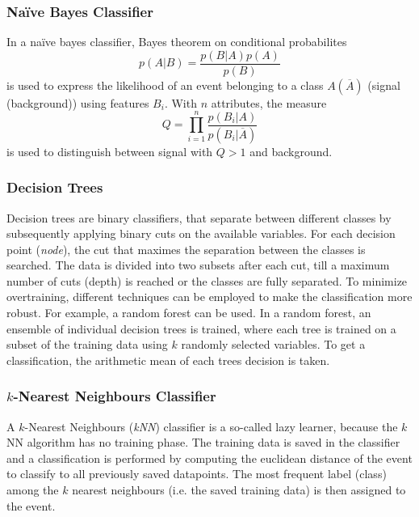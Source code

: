 \subsubsection{Na\"ive Bayes Classifier}
\label{subsec:Bayes}
In a na\"ive bayes classifier, Bayes theorem on conditional probabilites
\begin{equation}
    p(A|B) = \frac{p(B|A)p(A)}{p(B)}
    \label{eq:Bayes}
\end{equation}
is used to express the likelihood of an event belonging to a class $A(\overline{A})$ (signal (background)) using features $B_i$.
With $n$ attributes, the measure 
\begin{equation}
    Q = \prod_{i=1}^{n} \frac{p(B_i|A)}{p(B_i|\overline{A})}
\end{equation}
is used to distinguish between signal with $Q > 1$ and background.

\subsubsection{Decision Trees}
Decision trees are binary classifiers, that separate between different classes by subsequently applying binary cuts on the available variables. 
For each decision point (\textit{node}), the cut that maximes the separation between the classes is searched. The data is divided into two subsets after each cut, till a
maximum number of cuts (depth) is reached or the classes are fully separated.
To minimize overtraining, different techniques can be employed to make the classification more robust. 
For example, a random forest can be used. In a random forest, an ensemble of individual decision trees is trained, where each tree is trained on a subset of the training data
using $k$ randomly selected variables. To get a classification, the arithmetic mean of each trees decision is taken.

\subsubsection{$k$-Nearest Neighbours Classifier}
A $k$-Nearest Neighbours (\textit{kNN}) classifier is a so-called lazy learner, because the $k$NN algorithm has no training phase.
The training data is saved in the classifier and a classification is performed by computing the euclidean distance of the event to classify to 
all previously saved datapoints. The most frequent label (class) among the $k$ nearest neighbours (i.e. the saved training data) is then 
assigned to the event.

